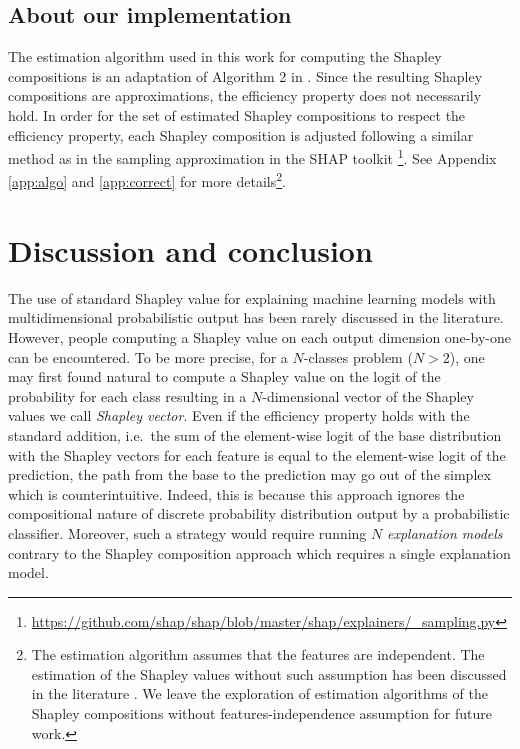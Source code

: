 \documentclass{article}
\theoremstyle{plain}
\theoremstyle{definition}
\theoremstyle{remark}
\begin{document}
\subsection{About our implementation}

The estimation algorithm used in this work for computing the Shapley compositions is an adaptation of Algorithm 2 in \cite{vstrumbelj2014explaining}. Since the resulting Shapley compositions are approximations, the efficiency property does not necessarily hold. In order for the set of estimated Shapley compositions to respect the efficiency property, each Shapley composition is adjusted following a similar method as in the sampling approximation in the SHAP toolkit \cite{NIPS2017_7062}\footnote{\url{https://github.com/shap/shap/blob/master/shap/explainers/_sampling.py}}. See Appendix \ref{app:algo} and \ref{app:correct} for more details\footnote{The estimation algorithm assumes that the features are independent. The estimation of the Shapley values without such assumption has been discussed in the literature \cite{AAS2021103502}. We leave the exploration of estimation algorithms of the Shapley compositions without features-independence assumption for future work.}.

\section{Discussion and conclusion}
\label{sec:conclud}

The use of standard Shapley value for explaining machine learning models with multidimensional probabilistic output has been rarely discussed in the literature. However, people computing a Shapley value on each output dimension one-by-one can be encountered. To be more precise, for a $N$-classes problem ($N>2$), one may first found natural to compute a Shapley value on the logit of the probability for each class resulting in a $N$-dimensional vector of the Shapley values we call \emph{Shapley vector}. Even if the efficiency property holds with the standard addition, i.e.~the sum of the element-wise logit of the base distribution with the Shapley vectors for each feature is equal to the element-wise logit of the prediction, the path from the base to the prediction may go out of the simplex which is counterintuitive. Indeed, this is because this approach ignores the compositional nature of discrete probability distribution output by a probabilistic classifier. Moreover, such a strategy would require running $N$ \emph{explanation models} contrary to the Shapley composition approach which requires a single explanation model.
\end{document}
